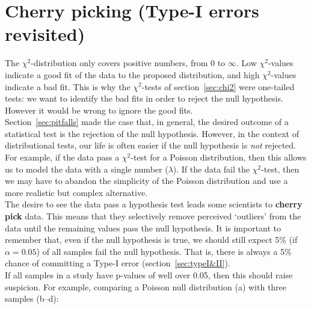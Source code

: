 \section{Cherry picking (Type-I errors revisited)}
\label{sec:cherrypicking}

The $\chi^2$-distribution only covers positive numbers, from 0 to
$\infty$. Low $\chi^2$-values indicate a good fit of the data to the
proposed distribution, and high $\chi^2$-values indicate a bad fit.
This is why the $\chi^2$-tests of section~\ref{sec:chi2} were
one-tailed tests: we want to identify the bad fits in order to reject
the null hypothesis. However it would be wrong to ignore the good
fits.\\

Section~\ref{sec:pitfalls} made the case that, in general, the desired
outcome of a statistical test is the rejection of the null hypothesis.
However, in the context of distributional tests, our life is often
easier if the null hypothesis is \emph{not} rejected. For example, if
the data pass a $\chi^2$-test for a Poisson distribution, then this
allows us to model the data with a single number ($\lambda$). If the
data fail the $\chi^2$-test, then we may have to abandon the
simplicity of the Poisson distribution and use a more realistic but
complex alternative.\\

The desire to see the data pass a hypothesis test leads some
scientists to \textbf{cherry pick} data. This means that they
selectively remove perceived `outliers' from the data until the
remaining values pass the null hypothesis. It is important to remember
that, even if the null hypothesis is true, we should still expect 5\%
(if $\alpha=0.05$) of all samples fail the null hypothesis. That is,
there is always a 5\% chance of committing a Type-I error
(section~\ref{sec:typeI&II}).\\

If all samples in a study have p-values of well over 0.05, then this
should raise suspicion. For example, comparing a Poisson null
distribution (a) with three samples (b--d):

